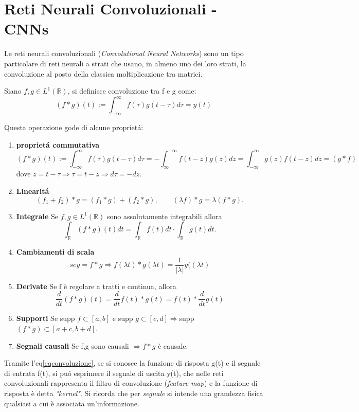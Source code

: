 \documentclass[a4paper,12pt]{report}
\begin{document}
\section{Reti Neurali Convoluzionali - CNNs}
Le reti neurali convoluzionali (\textit{Convolutional Neural Networks}) sono un tipo particolare di reti neurali a strati che usano, in almeno uno dei loro strati, la convoluzione al posto della classica moltiplicazione tra matrici.
\begin{defin}
Siano $f,g\in L^1(\mathbb{R})$, si definisce convoluzione tra f e g come:
\begin{equation}\label{eqconvoluzione}
(f*g)(t):= \int_{-\infty}^{\infty} f(\tau)g(t-\tau)d\tau=y(t)
\end{equation}
\end{defin}
Questa operazione gode di alcune propriet\'{a}:
\begin{enumerate}
\item \textbf{propriet\'{a} commutativa}$$
(f*g)(t):= \int_{-\infty}^{\infty} f(\tau)g(t-\tau)d\tau=-\int_{\infty}^{-\infty} f(t-z)g(z)dz=\int_{-\infty}^{\infty}g(z)f(t-z)dz=(g*f)$$
dove $z=t-\tau \Rightarrow \tau=t-z \Rightarrow d\tau=-dz$.
\item \textbf{Linearit\'{a}}$$ (f_1+f_2)*g=(f_1*g)+(f_2*g), \qquad (\lambda f)*g=\lambda(f*g).$$ 
\item \textbf{Integrale} Se $f,g\in L^1(\mathbb{R})$ sono assolutamente integrabili allora $$\int_{\mathbb{R}}(f*g)(t)dt=\int_{\mathbb{R}}f(t)dt \cdotp \int_{\mathbb{R}}g(t)dt.$$
\item \textbf{Cambiamenti di scala} $$se y=f*g\Rightarrow f(\lambda t)*g(\lambda t)=\frac{1}{|\lambda|}y((\lambda t)$$
\item \textbf{Derivate} Se f  \`e regolare a tratti e continua, allora 
$$ \frac{d}{dt}(f*g)(t)=\frac{d}{dt}f(t)*g(t)=f(t)*\frac{d}{dt}g(t)$$
\item \textbf{Supporti} Se supp $f\subset [a,b]$ e supp $g\subset [c,d]\Rightarrow $supp $(f*g)\subset [a+c,b+d].$
\item \textbf{Segnali causali} Se f,g sono causali $\Rightarrow f*g$ \`e causale.
\end{enumerate}
Tramite l'eq\ref{eqconvoluzione}, se si conosce la funzione di risposta g(t) e il segnale di entrata f(t), si pu\'{o} esprimere il segnale di uscita y(t), che nelle reti convoluzionali rappresenta il filtro di convoluzione (\textit{feature map}) e la funzione di risposta \`e detta \textit{"kernel"}.
Si ricorda che per \textit{segnale} si intende una grandezza fisica qualsiasi a cui \`e associata un'informazione.\\
\end{document}
